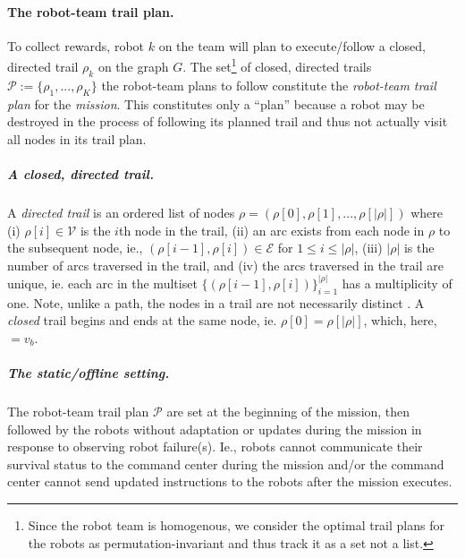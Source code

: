 \documentclass[11pt, oneside]{article}
\begin{document}
\paragraph{The robot-team trail plan.}
To collect rewards, robot $k$ on the team will plan to execute/follow a closed, directed trail $\rho_k$ on the graph $G$.  
The set\footnote{Since the robot team is homogenous, we consider the optimal trail plans for the robots as permutation-invariant and thus track it as a set not a list.} of closed, directed trails $\mathcal{P}:=\{\rho_1, ..., \rho_K\}$ the robot-team plans to follow constitute the \emph{robot-team trail plan} for the \emph{mission}. 
This constitutes only a ``plan'' because a robot may be destroyed in the process of following its planned trail and thus not actually visit all nodes in its trail plan.

\vspace{-\baselineskip}
\subparagraph{A closed, directed trail.} 
A \emph{directed trail} is an ordered list of nodes $\rho = (\rho[0], \rho[1], ..., \rho[\lvert \rho \rvert])$ where
(i) $\rho[i] \in \mathcal{V}$ is the $i$th node in the trail,  
(ii) an arc exists from each node in $\rho$ to the subsequent node, ie., $(\rho[i-1], \rho[i])\in\mathcal{E}$ for $1 \leq i  \leq \lvert \rho \rvert$,
(iii) $\lvert \rho \rvert$ is the number of arcs traversed in the trail,
and
(iv) the arcs traversed in the trail are unique, ie. each arc in the multiset $\{(\rho[i-1], \rho[i])\}_{i=1}^{\lvert \rho \rvert}$ has a multiplicity of one.
Note, unlike a path, the nodes in a trail are not necessarily distinct \cite{wilson1979introduction}.
A \emph{closed} trail begins and ends at the same node, ie. $\rho [0]=\rho[\lvert \rho \rvert]$, which, here, $=v_b$.

\vspace{-\baselineskip}
\subparagraph{The static/offline setting.} 
The robot-team trail plan $\mathcal{P}$ are set at the beginning of the mission, then followed by the robots without adaptation or updates during the mission in response to observing robot failure(s).
Ie., robots cannot communicate their survival status to the command center during the mission and/or the command center cannot send updated instructions to the robots after the mission executes.
\end{document}
